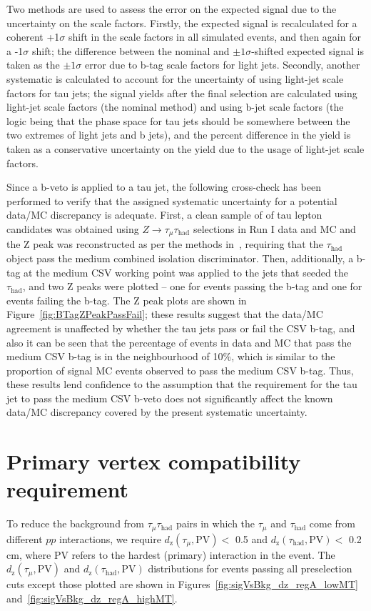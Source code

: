 Two methods are used to assess the error on the expected signal due to the uncertainty on the scale factors. Firstly, the expected signal is recalculated for a coherent +1$\sigma$ shift in the scale factors in all simulated events, and then again for a -1$\sigma$ shift; the difference between the nominal and $\pm1\sigma$-shifted expected signal is taken as the $\pm1\sigma$ error due to b-tag scale factors for light jets. Secondly, another systematic is calculated to account for the uncertainty of using light-jet scale factors for tau jets; the signal yields after the final selection are calculated using light-jet scale factors (the nominal method) and using b-jet scale factors (the logic being that the phase space for tau jets should be somewhere between the two extremes of light jets and b jets), and the percent difference in the yield is taken as a conservative uncertainty on the yield due to the usage of light-jet scale factors.

Since a b-veto is applied to a tau jet, the following cross-check has been performed to verify that the assigned systematic uncertainty for a potential data/MC discrepancy is adequate. First, a clean sample of of tau lepton candidates was obtained using $Z\rightarrow\tau_{\mu}\tau_{\text{had}}$ selections in Run I data and MC and the Z peak was reconstructed as per the methods in~\cite{Tau14001}, requiring that the $\tau_{\text{had}}$ object pass the medium combined isolation discriminator. Then, additionally, a b-tag at the medium CSV working point was applied to the jets that seeded the $\tau_{\text{had}}$, and two Z peaks were plotted -- one for events passing the b-tag and one for events failing the b-tag. The Z peak plots are shown in Figure~\ref{fig:BTagZPeakPassFail}; these results suggest that the data/MC agreement is unaffected by whether the tau jets pass or fail the CSV b-tag, and also it can be seen that the percentage of events in data and MC that pass the medium CSV b-tag is in the neighbourhood of 10\%, which is similar to the proportion of signal MC events observed to pass the medium CSV b-tag. Thus, these results lend confidence to the assumption that the requirement for the tau jet to pass the medium CSV b-veto does not significantly affect the known data/MC discrepancy covered by the present systematic uncertainty.

\section{Primary vertex compatibility requirement\label{sec:evtsel-dz}}
To reduce the background from $\tau_{\mu}\tau_{\text{had}}$ pairs in which the $\tau_{\mu}$ and $\tau_{\text{had}}$ come from different $pp$ interactions, we require $d_{\text{z}}(\tau_{\mu},\text{PV}) <$ 0.5 \cm and $d_{\text{z}}(\tau_{\text{had}},\text{PV}) <$ 0.2 cm, where PV refers to the hardest (primary) interaction in the event. The $d_{\text{z}}(\tau_{\mu},\text{PV})$ and $d_{\text{z}}(\tau_{\text{had}},\text{PV})$ distributions for events passing all preselection cuts except those plotted are shown in Figures~\ref{fig:sigVsBkg_dz_regA_lowMT} and~\ref{fig:sigVsBkg_dz_regA_highMT}.

